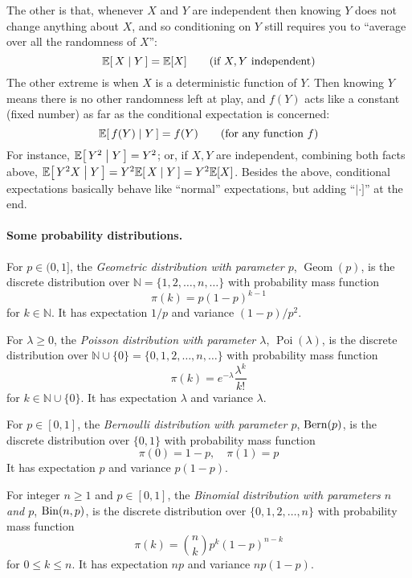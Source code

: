 The other is that, whenever $X$ and $Y$ are independent then knowing $Y$ does not change anything about $X$, and so conditioning on $Y$ still requires you to ``average over all the randomness of $X$'':
\[
\expectCond{X}{Y} = \expect{X} \tag{if $X,Y$ independent}
\]
The other extreme is when $X$ is a deterministic function of $Y$. Then knowing $Y$ means there is no other randomness left at play, and $f(Y)$ acts like a constant (fixed number) as far as the conditional expectation is concerned:
\[
\expectCond{f(Y)}{Y} = f(Y) \tag{for any function $f$}
\]
For instance, $\expectCond{Y^2}{Y} = Y^2$; or, if $X,Y$ are independent, combining both facts above, 
$\expectCond{Y^2 X}{Y} = Y^2 \expectCond{X}{Y} = Y^2\expect{X}$. Besides the above, conditional expectations basically behave like ``normal'' expectations, but adding ``$\mid \cdot ]$'' at the end.

\paragraph{Some probability distributions.} 
For $p\in(0,1]$, the \emph{Geometric distribution with parameter $p$}, $\operatorname{Geom}(p)$, is the discrete distribution over $\mathbb{N} = \{1,2,\dots, n,\dots\}$ with probability mass function 
\[
\pi(k) = p(1-p)^{k-1}
\] for $k\in\mathbb{N}$. It has expectation $1/p$ and variance $(1-p)/p^2$.

For $\lambda \geq 0$, the \emph{Poisson distribution with parameter $\lambda$}, $\operatorname{Poi}(\lambda)$, is the discrete distribution over $\mathbb{N}\cup \{0\} = \{0,1,2,\dots, n,\dots\}$ with probability mass function 
\[
\pi(k) = e^{-\lambda} \frac{\lambda^k}{k!}
\] for $k\in\mathbb{N}\cup \{0\}$. It has expectation $\lambda$ and variance $\lambda$.

For $p\in[0,1]$, the \emph{Bernoulli distribution with parameter $p$}, $\operatorname{Bern}( p ) $, is the discrete distribution over $\{0,1\}$ with probability mass function 
\[
\pi(0) = 1-p,\quad \pi(1)=p
\] It has expectation $p$ and variance $p(1-p)$.

For integer $n \geq 1$ and $p\in[0,1]$, the \emph{Binomial distribution with parameters $n$ and $p$}, $\binomial{n}{p}$, is the discrete distribution over $\{0,1,2,\dots, n\}$ with probability mass function 
\[
\pi(k) = \binom{n}{k} p^k(1-p)^{n-k}
\] for $0 \leq k \leq n$. It has expectation $np$ and variance $np(1-p)$.